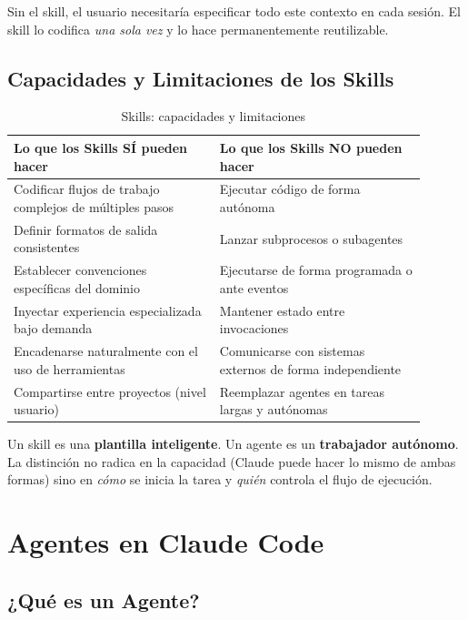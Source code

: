 \documentclass[11pt,letterpaper]{article}
\begin{document}
Sin el skill, el usuario necesitaría especificar todo este contexto en cada sesión. El skill lo codifica \emph{una sola vez} y lo hace permanentemente reutilizable.

\subsection{Capacidades y Limitaciones de los Skills}

\begin{table}[H]
\centering
\caption{Skills: capacidades y limitaciones}
\begin{tabular}{@{}p{0.45\linewidth}p{0.45\linewidth}@{}}
\toprule
\textbf{Lo que los Skills SÍ pueden hacer} & \textbf{Lo que los Skills NO pueden hacer} \\
\midrule
Codificar flujos de trabajo complejos de múltiples pasos & Ejecutar código de forma autónoma \\
Definir formatos de salida consistentes & Lanzar subprocesos o subagentes \\
Establecer convenciones específicas del dominio & Ejecutarse de forma programada o ante eventos \\
Inyectar experiencia especializada bajo demanda & Mantener estado entre invocaciones \\
Encadenarse naturalmente con el uso de herramientas & Comunicarse con sistemas externos de forma independiente \\
Compartirse entre proyectos (nivel usuario) & Reemplazar agentes en tareas largas y autónomas \\
\bottomrule
\end{tabular}
\end{table}

\begin{notebox}
Un skill es una \textbf{plantilla inteligente}. Un agente es un \textbf{trabajador autónomo}. La distinción no radica en la capacidad (Claude puede hacer lo mismo de ambas formas) sino en \emph{cómo} se inicia la tarea y \emph{quién} controla el flujo de ejecución.
\end{notebox}

\section{Agentes en Claude Code}

\subsection{¿Qué es un Agente?}
\end{document}
